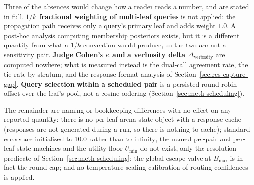Three of the absences would change how a reader reads a number, and are stated
in full. \textbf{$1/k$ fractional weighting of multi-leaf queries} is not
applied: the propagation path receives only a query's primary leaf and adds
weight $1.0$. A post-hoc analysis computing membership posteriors exists, but it
is a different quantity from what a $1/k$ convention would produce, so the two
are not a sensitivity pair. \textbf{Judge Cohen's $\kappa$ and a verbosity delta
$\Delta_{\text{verbosity}}$} are computed nowhere; what is measured instead is
the dual-call agreement rate, the tie rate by stratum, and the response-format
analysis of Section~\ref{sec:res-capture-gap}. \textbf{Query selection within a
scheduled pair} is a persisted round-robin offset over the leaf's pool, not a
cosine ordering (Section~\ref{sec:meth-scheduling}).

The remainder are naming or bookkeeping differences with no effect on any
reported quantity: there is no per-leaf arena state object with a response cache
(responses are not generated during a run, so there is nothing to cache);
standard errors are initialised to $10.0$ rather than to infinity; the named
per-pair and per-leaf state machines and the utility floor $U_{\min}$ do not
exist, only the resolution predicate of Section~\ref{sec:meth-scheduling}; the
global escape valve at $B_{\max}$ is in fact the round cap; and no
temperature-scaling calibration of routing confidences is applied.
